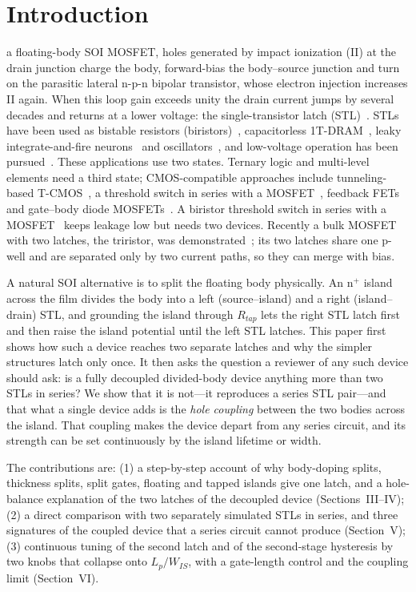 \documentclass[journal]{IEEEtran}
\begin{document}
\section{Introduction}
 a floating-body SOI MOSFET, holes generated by impact ionization (II) at the drain junction charge the body, forward-bias the body--source junction and turn on the parasitic lateral n-p-n bipolar transistor, whose electron injection increases II again. When this loop gain exceeds unity the drain current jumps by several decades and returns at a lower voltage: the single-transistor latch (STL)~\cite{chen_stl}. STLs have been used as bistable resistors (biristors)~\cite{han_biristor}, capacitorless 1T-DRAM~\cite{kim_1tdram,moon_fin}, leaky integrate-and-fire neurons~\cite{han_lif,han_mimic,han_sciadv} and oscillators~\cite{kim_osc}, and low-voltage operation has been pursued~\cite{lee_1v}. These applications use two states. Ternary logic and multi-level elements need a third state; CMOS-compatible approaches include tunneling-based T-CMOS~\cite{jeong_tcmos}, a threshold switch in series with a MOSFET~\cite{heo_nbo2,han_bts,han_ptmos}, feedback FETs~\cite{son_fbfet} and gate--body diode MOSFETs~\cite{kim_spti}. A biristor threshold switch in series with a MOSFET~\cite{han_bts,han_ptmos} keeps leakage low but needs two devices. Recently a bulk MOSFET with two latches, the triristor, was demonstrated~\cite{noh_triristor}; its two latches share one p-well and are separated only by two current paths, so they can merge with bias.

A natural SOI alternative is to split the floating body physically. An n$^+$ island across the film divides the body into a left (source--island) and a right (island--drain) STL, and grounding the island through $R_{tap}$ lets the right STL latch first and then raise the island potential until the left STL latches. This paper first shows how such a device reaches two separate latches and why the simpler structures latch only once. It then asks the question a reviewer of any such device should ask: is a fully decoupled divided-body device anything more than two STLs in series? We show that it is not---it reproduces a series STL pair---and that what a single device adds is the \textit{hole coupling} between the two bodies across the island. That coupling makes the device depart from any series circuit, and its strength can be set continuously by the island lifetime or width.

The contributions are: (1) a step-by-step account of why body-doping splits, thickness splits, split gates, floating and tapped islands give one latch, and a hole-balance explanation of the two latches of the decoupled device (Sections~III--IV); (2) a direct comparison with two separately simulated STLs in series, and three signatures of the coupled device that a series circuit cannot produce (Section~V); (3) continuous tuning of the second latch and of the second-stage hysteresis by two knobs that collapse onto $L_p/W_{IS}$, with a gate-length control and the coupling limit (Section~VI).
\end{document}
